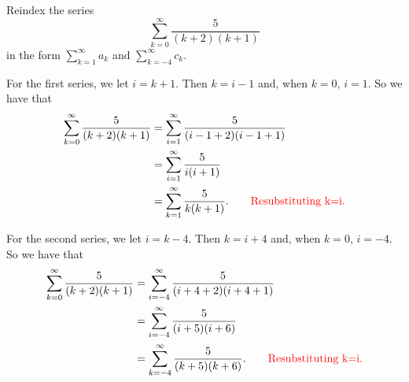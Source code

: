 \documentclass[noinstructornotes]{ximera}
\begin{document}
%	
%	
%	
%
%
%







\begin{problem}
Reindex the series
	\[
	\sum_{k=0}^\infty \frac{5}{(k+2)(k+1)}
	\]
in the form $\sum_{k=1}^\infty a_k$ and $\sum_{k=-4}^\infty c_k$.
	\begin{freeResponse}
	For the first series, we let $i = k+1$.
	Then $k = i-1$ and, when $k=0$, $i = 1$.
	So we have that
		\begin{align*}
		\sum_{k=0}^\infty \frac{5}{(k+2)(k+1)}
		&= \sum_{i=1}^\infty \frac{5}{(i-1+2)(i-1+1)}  \\
		&= \sum_{i=1}^\infty \frac{5}{i(i+1)}  \\
		&= \sum_{k=1}^\infty \frac{5}{k(k+1)}.  	\qquad	{\color{red}\text{Resubstituting k=i.}}
		\end{align*}
		
	For the second series, we let $i=k-4$.  
	Then $k=i+4$ and, when $k=0$, $i = -4$.  
	So we have that
		\begin{align*}
		\sum_{k=0}^\infty \frac{5}{(k+2)(k+1)}
		&= \sum_{i=-4}^\infty \frac{5}{(i+4+2)(i+4+1)}  \\
		&= \sum_{i=-4}^\infty \frac{5}{(i+5)(i+6)}  \\
		&= \sum_{k=-4}^\infty \frac{5}{(k+5)(k+6)}.  	\qquad	{\color{red}\text{Resubstituting k=i.}}
		\end{align*}
	\end{freeResponse}

\end{problem}
\end{document}
